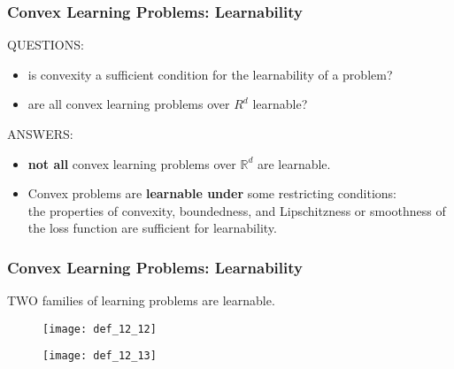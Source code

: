 \begin{frame}
\frametitle{Convex Learning Problems: Learnability}
QUESTIONS:
\begin{itemize}
    \item is convexity a sufficient condition for the learnability of a problem?
    \item are all convex learning problems over $R^d$ learnable?
\end{itemize}
\vspace{5mm}

ANSWERS:\\
\begin{itemize}
    \item \textbf{not all} convex learning problems over $\mathbb{R}^d$ are learnable.
    \item Convex problems are \textbf{learnable under} some restricting conditions:\\
        the properties of convexity, boundedness, and Lipschitzness or smoothness
        of the loss function are sufficient for learnability.
\end{itemize}

\end{frame}

\begin{frame}
\frametitle{Convex Learning Problems: Learnability}
TWO families of learning problems are learnable.

\noindent\makebox[\linewidth]{\rule{\paperwidth}{0.4pt}}

\begin{figure}
    \centering
    \texttt{[image: def\_12\_12]}
\end{figure}

\noindent\makebox[\linewidth]{\rule{\paperwidth}{0.4pt}}

\begin{figure}
    \centering
    \texttt{[image: def\_12\_13]}
\end{figure}

\end{frame}


